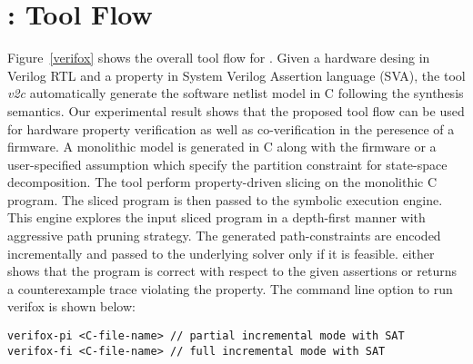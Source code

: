 \section{\verifox: Tool Flow} 
Figure~\ref{verifox} shows the overall tool flow for \verifox. Given a 
hardware desing in Verilog RTL and a property in System Verilog Assertion
language (SVA), the tool \emph{v2c} automatically generate the software netlist 
model in C following the synthesis semantics. Our experimental result shows that 
the proposed tool flow can be used for hardware property verification as well as 
co-verification in the peresence of a firmware. A monolithic model is generated in
C along with the firmware or a user-specified assumption which specify the 
partition constraint for state-space decomposition. The tool perform
property-driven slicing on the monolithic C program. The sliced program is then
passed to the symbolic execution engine. This engine explores the input 
sliced program in a depth-first manner with aggressive path pruning strategy. 
The generated path-constraints are encoded incrementally and passed to the
underlying solver only if it is feasible. \verifox either shows that the program 
is correct with respect to the given assertions or returns a counterexample
trace violating the property. The command line option to run verifox is shown
below:
\begin{lstlisting}[basicstyle=\scriptsize]
verifox-pi <C-file-name> // partial incremental mode with SAT
verifox-fi <C-file-name> // full incremental mode with SAT
\end{lstlisting}
